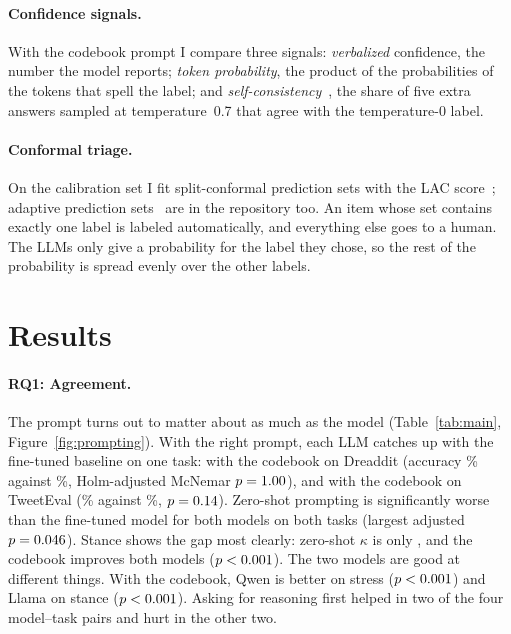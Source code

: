 \documentclass[10pt,twocolumn]{article}
\begin{document}
\paragraph{Confidence signals.} With the codebook prompt I compare three signals:
\emph{verbalized} confidence, the number the model reports; \emph{token probability}, the product
of the probabilities of the tokens that spell the label; and
\emph{self-consistency}~\cite{wang2023selfconsistency}, the share of five extra answers sampled
at temperature~0.7 that agree with the temperature-0 label.

\paragraph{Conformal triage.} On the calibration set I fit split-conformal prediction sets with
the LAC score~\cite{sadinle2019lac}; adaptive prediction sets~\cite{romano2020aps} are in the
repository too. An item whose set contains exactly one label is labeled automatically, and
everything else goes to a human. The LLMs only give a probability for the label they chose, so
the rest of the probability is spread evenly over the other labels.

\section{Results}

\begin{table}[t]
\centering\small

\caption{Agreement with gold labels on the evaluation sets (Cohen's $\kappa$ with 95\% bootstrap
CIs over items; macro-F1). Bold: best LLM configuration per dataset. Krippendorff's $\alpha$
tracks $\kappa$ closely and is reported in the repository.}
\label{tab:main}
\end{table}

\paragraph{RQ1: Agreement.} The prompt turns out to matter about as much as the model
(Table~\ref{tab:main}, Figure~\ref{fig:prompting}). With the right prompt, each LLM catches up
with the fine-tuned baseline on one task: \bestModelDr{} with the codebook on Dreaddit (accuracy
\accBestDr\% against \accFtDr\%, Holm-adjusted McNemar $p=1.00$), and \bestModelTe{} with
the codebook on TweetEval (\accBestTe\% against \accFtTe\%, $p=0.14$). Zero-shot prompting
is significantly worse than the fine-tuned model for both models on both tasks (largest adjusted
$p=0.046$). Stance shows the gap most clearly: zero-shot $\kappa$ is only
\kappaZsRangeTe{}, and the codebook improves both models ($p<0.001$). The two models are
good at different things. With the codebook, Qwen is better on stress ($p<0.001$) and
Llama on stance ($p<0.001$). Asking for reasoning first helped in two of the four
model--task pairs and hurt in the other two.
\end{document}
